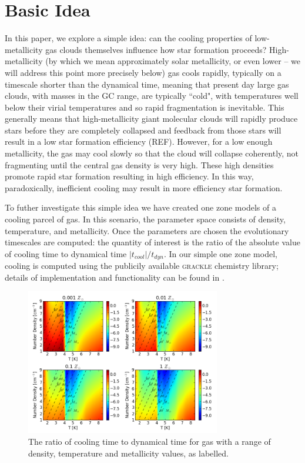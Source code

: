 \documentclass[useAMS,usenatbib]{mn2e}
\begin{document}
%
\section{Basic Idea}
\label{sec:basic}

In this paper, we explore a simple idea: can the cooling properties of low-metallicity gas clouds themselves influence how star formation proceeds?  High-metallicity (by which we mean approximately solar metallicity, or even lower -- we will address this point more precisely below) gas cools rapidly, typically on a timescale shorter than the dynamical time, meaning that present day large gas clouds, with masses in the GC range, are typically ``cold", with temperatures well below their virial temperatures and so rapid fragmentation is inevitable.  This generally means that high-metallicity giant molecular clouds will rapidly produce stars before they are completely collapsed and feedback from those stars will result in a low star formation efficiency (REF).  However, for a low enough metallicity, the gas may cool slowly so that the cloud will collapse coherently, not fragmenting until the central gas density is very high.  These high densities promote rapid star formation resulting in high efficiency.  In this way, paradoxically, inefficient cooling may result in more efficiency star formation.

To futher investigate this simple idea we have created one zone models of a cooling parcel of gas. In 
this scenario, the parameter space consists of density, temperature, and metallicity. Once the parameters
are chosen the evolutionary timescales are computed: the quantity of interest is the ratio of the absolute value of cooling
time to dynamical time $|t_{cool}|/t_{dyn}$. In our simple one zone model, cooling is computed using the
publicily available \textsc{grackle} chemistry library; details of implementation and functionality can be found
in \cite{Bryan2013}.
\begin{figure}
\begin{center}
\mbox{\includegraphics[width=8.5cm]{Images/cooling_to_freefall_no_background}}
\end{center}
\caption{\label{fig:cooling_to_freefall} The ratio of cooling time to dynamical time for gas with a range of density, temperature and metallicity values, as labelled.}
\end{figure}
\end{document}

